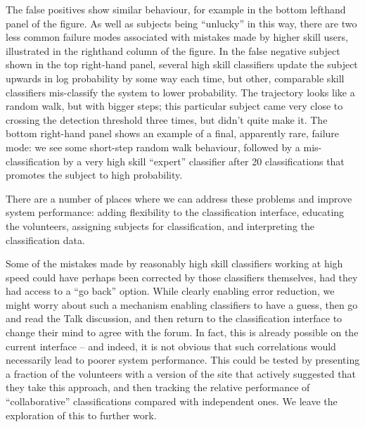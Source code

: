 \documentclass[useAMS,usenatbib,a4paper]{mn2e}
\begin{document}
The false positives show similar behaviour, for example in the bottom lefthand
panel of the figure. As well as subjects being ``unlucky'' in this way, there
are two less common failure modes associated with mistakes made by higher skill
users, illustrated in the righthand column of the figure. In the false negative
subject shown in the top right-hand panel, several high skill classifiers update
the subject upwards in log probability by some way each time, but other,
comparable skill classifiers mis-classify the system to lower probability.   The
trajectory looks like a random walk, but with bigger steps; this particular
subject came very close to crossing the detection  threshold three times, but
didn't quite make it. The bottom right-hand panel shows an example of a final,
apparently rare, failure mode: we see some short-step random walk behaviour,
followed by a mis-classification by a very high skill ``expert'' classifier
after 20 classifications that promotes the subject to high probability.

There are a number of places where we can address these problems and
improve system performance: adding flexibility to the classification
interface, educating the volunteers, assigning subjects for
classification, and interpreting the classification data.

Some of  the mistakes made by reasonably high skill
classifiers working at high speed
could have perhaps been corrected by those classifiers themselves, had
they had access to a ``go back'' option. While clearly enabling error
reduction, we might worry about such a mechanism enabling classifiers to have
a guess, then go and read the Talk discussion, and then return to the
classification interface to change their mind to agree with the forum. In
fact, this is already possible on the current interface -- and indeed, it is
not obvious that such correlations would necessarily lead to poorer system
performance. This could be tested by presenting a fraction of the volunteers
with a version of the site that actively suggested that they take this
approach, and then tracking the relative performance of ``collaborative''
classifications compared with independent ones. We leave the exploration of
this to further
work.
\end{document}
